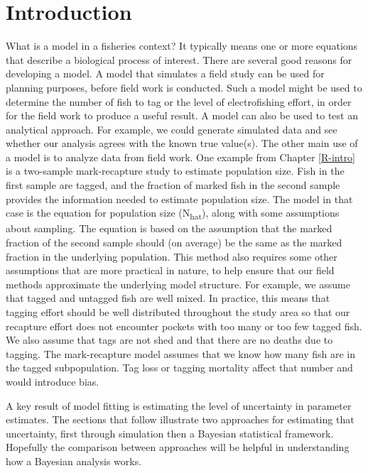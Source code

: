 \documentclass[
]{krantz}
\begin{document}
\hypertarget{introduction-1}{%
\section{Introduction}\label{introduction-1}}

What is a model in a fisheries context? It typically means one or more equations that describe a biological process of interest. There are several good reasons for developing a model. A model that simulates a field study can be used for planning purposes, before field work is conducted. Such a model might be used to determine the number of fish to tag or the level of electrofishing effort, in order for the field work to produce a useful result. A model can also be used to test an analytical approach. For example, we could generate simulated data and see whether our analysis agrees with the known true value(s). The other main use of a model is to analyze data from field work. One example from Chapter \ref{R-intro} is a two-sample mark-recapture study to estimate population size. Fish in the first sample are tagged, and the fraction of marked fish in the second sample provides the information needed to estimate population size. The model in that case is the equation for population size (N\textsubscript{hat}), along with some assumptions about sampling. The equation is based on the assumption that the marked fraction of the second sample should (on average) be the same as the marked fraction in the underlying population. This method also requires some other assumptions that are more practical in nature, to help ensure that our field methods approximate the underlying model structure. For example, we assume that tagged and untagged fish are well mixed. In practice, this means that tagging effort should be well distributed throughout the study area so that our recapture effort does not encounter pockets with too many or too few tagged fish. We also assume that tags are not shed and that there are no deaths due to tagging. The mark-recapture model assumes that we know how many fish are in the tagged subpopulation. Tag loss or tagging mortality affect that number and would introduce bias.

A key result of model fitting is estimating the level of uncertainty in parameter estimates. The sections that follow illustrate two approaches for estimating that uncertainty, first through simulation then a Bayesian statistical framework. Hopefully the comparison between approaches will be helpful in understanding how a Bayesian analysis works.
\end{document}
